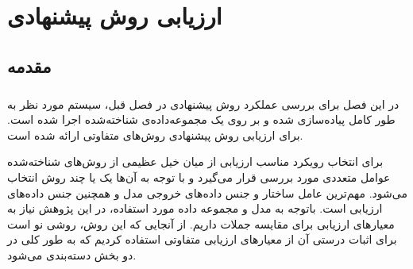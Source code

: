 
\chapter{ارزیابی روش پیشنهادی} \label{ch:eval}
\thispagestyle{empty}


\section{مقدمه}
\paragraph{}{
    در این فصل برای بررسی عملکرد روش پیشنهادی در فصل قبل، سیستم مورد نظر به طور کامل پیاده‌سازی
    شده و بر روی یک مجموعه‌داده‌ی شناخته‌شده اجرا شده است.
    برای ارزیابی روش پیشنهادی روش‌های متفاوتی ارائه شده است. 

    برای انتخاب رویکرد مناسب ارزیابی از میان خیل عظیمی از روش‌های شناخته‌شده
    عوامل متعددی مورد بررسی قرار می‌گیرد و با توجه به آن‌ها یک یا چند روش انتخاب می‌شود.
    مهم‌ترین عامل ساختار و جنس داده‌های خروجی مدل و همچنین جنس داده‌های ارزیابی است. باتوجه به مدل و مجموعه
    داده‌ مورد استفاده، در این پژوهش نیاز به معیارهای ارزیابی برای مقایسه جملات داریم. 
    از آنجایی که این روش، روشی نو است برای اثبات درستی آن از معیار‌های ارزیابی متفاوتی استفاده کردیم 
    که به طور کلی در دو بخش دسته‌بندی می‌شود. 
}



